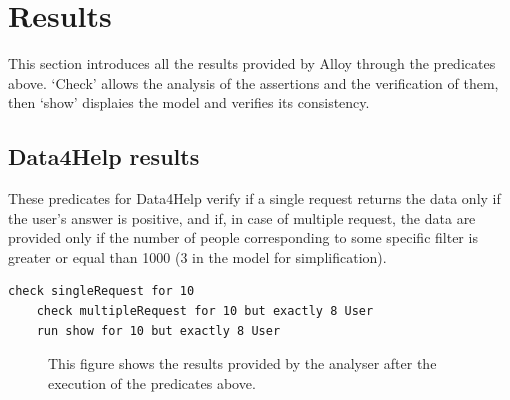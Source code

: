 \section{Results}

    This section introduces all the results provided by Alloy through the predicates above. `Check' allows the analysis of the assertions and the verification of them, then `show' displaies the model and verifies its consistency.
    
    \subsection{Data4Help results}
    These predicates for Data4Help verify if a single request returns the data only if the user's answer is positive, and if, in case of multiple request, the data are provided only if the number of people corresponding to some specific filter is greater or equal than 1000 (3 in the model for simplification).\\
  
\begin{lstlisting}[language=alloy]
    check singleRequest for 10
    check multipleRequest for 10 but exactly 8 User
    run show for 10 but exactly 8 User
\end{lstlisting}

    \begin{figure}[H]
        \centering
        \caption{ This figure shows the results provided by the analyser after the execution of the predicates above.}
        \label{ fig:D4H-Results }
    \end{figure}
    
